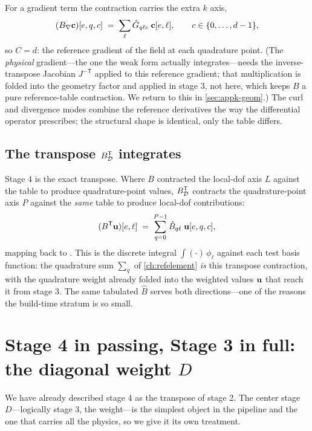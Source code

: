 For a gradient term the contraction carries the extra $k$ axis,
\[
  (B_{\nabla}\mathbf{c})[e,q,c] \;=\; \sum_{\ell} \hat G_{q\ell c}\;\mathbf{c}[e,\ell],
  \qquad c\in\{0,\dots,d-1\},
\]
so $C=d$: the reference gradient of the field at each quadrature point. (The
\emph{physical} gradient---the one the weak form actually integrates---needs the
inverse-transpose Jacobian $J^{-\mathsf T}$ applied to this reference gradient; that
multiplication is folded into the geometry factor and applied in stage 3, not here,
which keeps $B$ a pure reference-table contraction. We return to this in
\cref{sec:appk-geom}.) The curl and divergence modes combine the reference
derivatives the way the differential operator prescribes; the structural shape is
identical, only the table differs.

\subsection{The transpose $B_{\mathcal{D}}^{\mathsf T}$ integrates}

Stage 4 is the exact transpose. Where $B$ contracted the local-dof axis $L$ against
the table to produce quadrature-point values, $B_{\mathcal{D}}^{\mathsf T}$ contracts
the quadrature-point axis $P$ against the \emph{same} table to produce local-dof
contributions:
\begin{equation}
  (B^{\mathsf T}\mathbf{u})[e,\ell] \;=\; \sum_{q=0}^{P-1} \hat B_{q\ell}\;\mathbf{u}[e,q,c],
  \label{eq:appk-basist}
\end{equation}
mapping \code{[(E, P, C)]} back to \code{[(E, L)]}. This is the discrete integral
$\int(\cdot)\,\phi_\ell$ against each test basis function: the quadrature sum
$\sum_q$ of \cref{ch:refelement} \emph{is} this transpose contraction, with the
quadrature weight already folded into the weighted values $\mathbf{u}$ that reach it from
stage 3. The same tabulated $\hat B$ serves both directions---one of the reasons
the build-time stratum is so small.

\section{Stage 4 in passing, Stage 3 in full: the diagonal weight \texorpdfstring{$D$}{D}}
\label{sec:appk-diagonal}

We have already described stage 4 as the transpose of stage 2. The center stage
$D$---logically stage 3, the weight---is the simplest object in the pipeline and
the one that carries all the physics, so we give it its own treatment.

